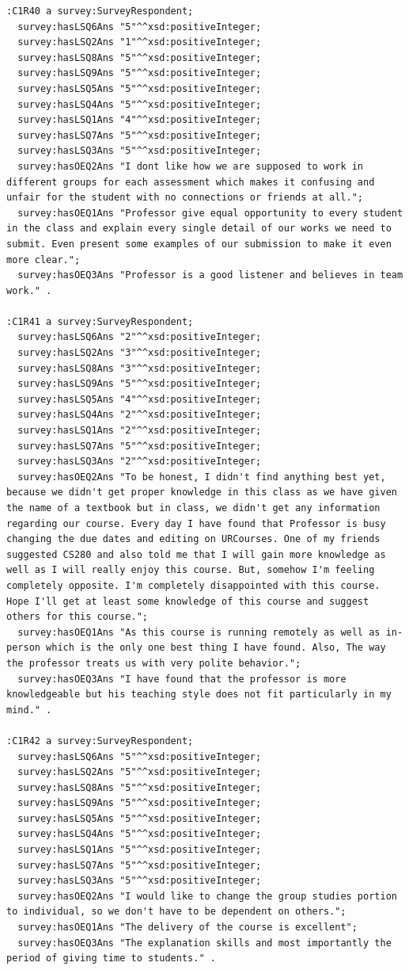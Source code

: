 \begin{lstlisting}
:C1R40 a survey:SurveyRespondent;
  survey:hasLSQ6Ans "5"^^xsd:positiveInteger;
  survey:hasLSQ2Ans "1"^^xsd:positiveInteger;
  survey:hasLSQ8Ans "5"^^xsd:positiveInteger;
  survey:hasLSQ9Ans "5"^^xsd:positiveInteger;
  survey:hasLSQ5Ans "5"^^xsd:positiveInteger;
  survey:hasLSQ4Ans "5"^^xsd:positiveInteger;
  survey:hasLSQ1Ans "4"^^xsd:positiveInteger;
  survey:hasLSQ7Ans "5"^^xsd:positiveInteger;
  survey:hasLSQ3Ans "5"^^xsd:positiveInteger;
  survey:hasOEQ2Ans "I dont like how we are supposed to work in different groups for each assessment which makes it confusing and unfair for the student with no connections or friends at all.";
  survey:hasOEQ1Ans "Professor give equal opportunity to every student in the class and explain every single detail of our works we need to submit. Even present some examples of our submission to make it even more clear.";
  survey:hasOEQ3Ans "Professor is a good listener and believes in team work." .

:C1R41 a survey:SurveyRespondent;
  survey:hasLSQ6Ans "2"^^xsd:positiveInteger;
  survey:hasLSQ2Ans "3"^^xsd:positiveInteger;
  survey:hasLSQ8Ans "3"^^xsd:positiveInteger;
  survey:hasLSQ9Ans "5"^^xsd:positiveInteger;
  survey:hasLSQ5Ans "4"^^xsd:positiveInteger;
  survey:hasLSQ4Ans "2"^^xsd:positiveInteger;
  survey:hasLSQ1Ans "2"^^xsd:positiveInteger;
  survey:hasLSQ7Ans "5"^^xsd:positiveInteger;
  survey:hasLSQ3Ans "2"^^xsd:positiveInteger;
  survey:hasOEQ2Ans "To be honest, I didn't find anything best yet, because we didn't get proper knowledge in this class as we have given the name of a textbook but in class, we didn't get any information regarding our course. Every day I have found that Professor is busy changing the due dates and editing on URCourses. One of my friends suggested CS280 and also told me that I will gain more knowledge as well as I will really enjoy this course. But, somehow I'm feeling completely opposite. I'm completely disappointed with this course. Hope I'll get at least some knowledge of this course and suggest others for this course.";
  survey:hasOEQ1Ans "As this course is running remotely as well as in-person which is the only one best thing I have found. Also, The way the professor treats us with very polite behavior.";
  survey:hasOEQ3Ans "I have found that the professor is more knowledgeable but his teaching style does not fit particularly in my mind." .

:C1R42 a survey:SurveyRespondent;
  survey:hasLSQ6Ans "5"^^xsd:positiveInteger;
  survey:hasLSQ2Ans "5"^^xsd:positiveInteger;
  survey:hasLSQ8Ans "5"^^xsd:positiveInteger;
  survey:hasLSQ9Ans "5"^^xsd:positiveInteger;
  survey:hasLSQ5Ans "5"^^xsd:positiveInteger;
  survey:hasLSQ4Ans "5"^^xsd:positiveInteger;
  survey:hasLSQ1Ans "5"^^xsd:positiveInteger;
  survey:hasLSQ7Ans "5"^^xsd:positiveInteger;
  survey:hasLSQ3Ans "5"^^xsd:positiveInteger;
  survey:hasOEQ2Ans "I would like to change the group studies portion to individual, so we don't have to be dependent on others.";
  survey:hasOEQ1Ans "The delivery of the course is excellent";
  survey:hasOEQ3Ans "The explanation skills and most importantly the period of giving time to students." .


\end{lstlisting}
